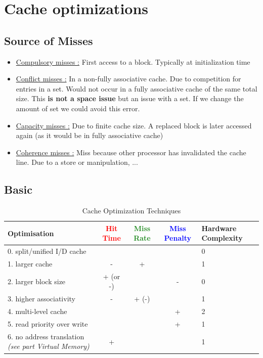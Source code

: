 \documentclass{report}
\begin{document}
\section{Cache optimizations}

\subsection{Source of Misses}

\begin{itemize}
    \item \underline{Compulsory misses :} First access to a block. Typically at initialization time
    \item \underline{Conflict misses :} In a non-fully associative cache. Due to competition for entries in a set. Would not occur in a fully associative cache of the same total size. This \textbf{is not a space issue} but an issue with a set. If we change the amount of set we could avoid this error.
    \item \underline{Capacity misses :} Due to finite cache size. A replaced block is later accessed again (as it would be in fully associative cache)
    \item \underline{Coherence misses :} Miss because other processor has invalidated the cache line. Due to a store or manipulation, ...
\end{itemize}

\subsection{Basic}

\begin{table}[h]
    \centering
    \renewcommand{\arraystretch}{1.3}
    \begin{tabular}{|p{4.5cm}|c|c|c|p{2.5cm}|}
        \hline
        \textbf{Optimisation} & 
        \textbf{\textcolor{red}{Hit Time}} & 
        \textbf{\textcolor{ForestGreen}{Miss Rate}} & 
        \textbf{\textcolor{blue}{Miss Penalty}} & 
        \textbf{Hardware Complexity} \\
        \hline
        0. split/unified I/D cache & & & & 0 \\
        \hline
        1. larger cache & - & + & & 1 \\
        \hline
        2. larger block size & + (or -) & & - & 0 \\
        \hline
        3. higher associativity & - & + (-) & & 1 \\
        \hline
        4. multi-level cache & & & + & 2 \\
        \hline
        5. read priority over write & & & + & 1 \\
        \hline
        6. no address translation \newline \textit{(see part Virtual Memory)} & + & & & 1 \\
        \hline
    \end{tabular}
    \caption{Cache Optimization Techniques}
    \label{tab:cache_optimisation}
\end{table}
\end{document}
